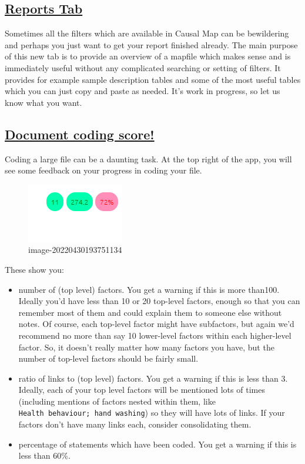 \documentclass[
]{book}
\providecommand{\tightlist}{%
  \setlength{\itemsep}{0pt}\setlength{\parskip}{0pt}}
\begin{document}
\hypertarget{reports-tab}{%
\subsection{\texorpdfstring{\href{xreports}{Reports Tab}}{Reports Tab}}\label{reports-tab}}

Sometimes all the filters which are available in Causal Map can be bewildering and perhaps you just want to get your report finished already. The main purpose of this new tab is to provide an overview of a mapfile which makes sense and is immediately useful without any complicated searching or setting of filters. It provides for example sample description tables and some of the most useful tables which you can just copy and paste as needed. It's work in progress, so let us know what you want.

\hypertarget{document-coding-score}{%
\subsection{\texorpdfstring{\protect\hyperlink{xgamification}{Document coding score!}}{Document coding score!}}\label{document-coding-score}}

Coding a large file can be a daunting task. At the top right of the app, you will see some feedback on your progress in coding your file.

\begin{figure}
\centering
\includegraphics{_assets/image-20220430193751134.png}
\caption{image-20220430193751134}
\end{figure}

These show you:

\begin{itemize}
\tightlist
\item
  number of (top level) factors. You get a warning if this is more than100. Ideally you'd have less than 10 or 20 top-level factors, enough so that you can remember most of them and could explain them to someone else without notes. Of course, each top-level factor might have subfactors, but again we'd recommend no more than say 10 lower-level factors within each higher-level factor. So, it doesn't really matter how many factors you have, but the number of top-level factors should be fairly small.
\item
  ratio of links to (top level) factors. You get a warning if this is less than 3. Ideally, each of your top level factors will be mentioned lots of times (including mentions of factors nested within them, like \texttt{Health\ behaviour;\ hand\ washing}) so they will have lots of links. If your factors don't have many links each, consider consolidating them.
\item
  percentage of statements which have been coded. You get a warning if this is less than 60\%.
\end{itemize}
\end{document}
